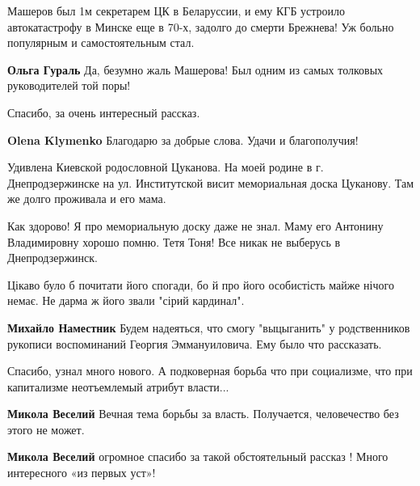 \begin{itemize}
\begin{itemize}
Машеров был 1м секретарем ЦК в Беларуссии, и ему КГБ устроило автокатастрофу в Минске еще в 70-х, задолго до смерти Брежнева! Уж больно популярным и самостоятельным стал.

\begin{itemize} %
\textbf{Ольга Гураль} Да, безумно жаль Машерова! Был одним из самых толковых руководителей той поры!
\end{itemize} %

\end{itemize} %

Спасибо, за очень интересный рассказ.

\begin{itemize} %
\textbf{Olena Klymenko} Благодарю за добрые слова. Удачи и благополучия!
\end{itemize} %


Удивлена Киевской родословной Цуканова. На моей родине в г. Днепродзержинске на
ул. Институтской висит мемориальная доска Цуканову. Там же долго проживала и его
мама.


Как здорово! Я про мемориальную доску даже не знал. Маму его Антонину
Владимировну хорошо помню. Тетя Тоня! Все никак не выберусь в Днепродзержинск.


Цікаво було б почитати його спогади, бо й про його особистість майже нічого немає. Не дарма ж його звали "сірий кардинал".

\begin{itemize} %
\textbf{Михайло Наместник} Будем надеяться, что смогу "выцыганить" у родственников рукописи воспоминаний Георгия Эммануиловича. Ему было что рассказать.
\end{itemize} %

Спасибо, узнал много нового. А подковерная борьба что при социализме, что при капитализме неотъемлемый атрибут власти...

\begin{itemize} %
\textbf{Микола Веселий} Вечная тема борьбы за власть. Получается, человечество без этого не может.

\textbf{Микола Веселий} огромное спасибо за такой обстоятельный рассказ ! Много интересного «из первых уст»!


\end{itemize}
\end{itemize}
